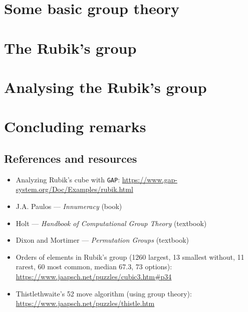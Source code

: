 \documentclass[handout]{beamer}
\begin{document}
\section{Some basic group theory}



\section{The Rubik's group}



\section{Analysing the Rubik's group}

% 

\section{Concluding remarks}

\subsection{References and resources}

\begin{slide}
    \begin{itemize}
        \item Analyzing Rubik's cube with \texttt{GAP}: \url{https://www.gap-system.org/Doc/Examples/rubik.html}
        \item J.A. Paulos --- \textit{Innumeracy} (book)
        \item Holt --- \textit{Handbook of Computational Group Theory} (textbook)
        \item Dixon and Mortimer --- \textit{Permutation Groups} (textbook)
        \item Orders of elements in Rubik's group (1260 largest, 13 smallest without, 11 rarest, 60 most common, median 67.3, 73 options): \url{https://www.jaapsch.net/puzzles/cubic3.htm\#p34}
        \item Thistlethwaite's 52 move algorithm (using group theory): \url{https://www.jaapsch.net/puzzles/thistle.htm}
    \end{itemize}
\end{slide}


\end{document}
